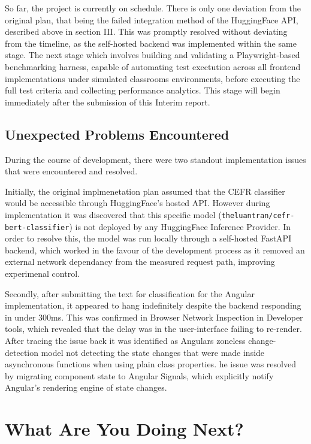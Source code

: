 \documentclass[conference]{IEEEtran}
\begin{document}
\medskip

So far, the project is currently on schedule. There is only one deviation from the original plan, that being the failed integration method of the HuggingFace API, described above in section III. This was promptly resolved without deviating from the timeline, as the self-hosted backend was implemented within the same stage. The next stage which involves building and validating a Playwright-based benchmarking harness, capable of automating test exectution across all frontend implementations under simulated classrooms environments, before executing the full test criteria and collecting performance analytics. This stage will begin immediately after the submission of this Interim report.     
\subsection{Unexpected Problems Encountered}

During the course of development, there were two standout implementation issues that were encountered and resolved.

\medskip

Initially, the original implmenetation plan assumed that the CEFR classifier would be accessible through HuggingFace's hosted API. However during implementation it was discovered that this specific model (\texttt{theluantran/cefr-bert-classifier}) is not deployed by any HuggingFace Inference Provider. In order to resolve this, the model was run locally through a self-hosted FastAPI backend, which worked in the favour of the development process as it removed an external network dependancy from the measured request path, improving experimenal control. 

\medskip

Secondly, after submitting the text for classification for the Angular implementation, it appeared to hang indefinitely despite the backend responding in under 300ms. This was confirmed in Browser Network Inspection in Developer tools, which revealed that the delay was in the user-interface failing to re-render. After tracing the issue back it was identified as Angulars zoneless change-detection model not detecting the state changes that were made inside asynchronous functions when using plain class properties. he
issue was resolved by migrating component state to Angular Signals, which
explicitly notify Angular's rendering engine of state changes.   

\section{What Are You Doing Next? }
\end{document}
